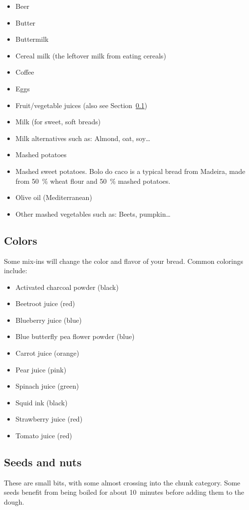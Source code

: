 \begin{itemize}
  \item Beer
  \item Butter
  \item Buttermilk
  \item Cereal milk (the leftover milk from eating cereals)
  \item Coffee
  \item Eggs
  \item Fruit/vegetable juices (also see Section~\ref{section:colors})
  \item Milk (for sweet, soft breads)
  \item Milk alternatives such as: Almond, oat, soy\dots{}
  \item Mashed potatoes
  \item Mashed sweet potatoes. Bolo do caco is a typical bread from Madeira,
    made from \qty{50}{\percent} wheat flour and \qty{50}{\percent} mashed potatoes.
  \item Olive oil (Mediterranean)
  \item Other mashed vegetables such as: Beets, pumpkin\dots{}
\end{itemize}

\subsection{Colors}%
\label{section:colors}
Some mix-ins will change the color and flavor of your bread. Common colorings
include:

\begin{itemize}
  \item Activated charcoal powder (black)
  \item Beetroot juice (red)
  \item Blueberry juice (blue)
  \item Blue butterfly pea flower powder (blue)
  \item Carrot juice (orange)
  \item Pear juice (pink)
  \item Spinach juice (green)
  \item Squid ink (black)
  \item Strawberry juice (red)
  \item Tomato juice (red)
\end{itemize}

\subsection{Seeds and nuts}
These are small bits, with some almost crossing into the chunk category. Some
seeds benefit from being boiled for about 10~minutes before adding them to the
dough.

